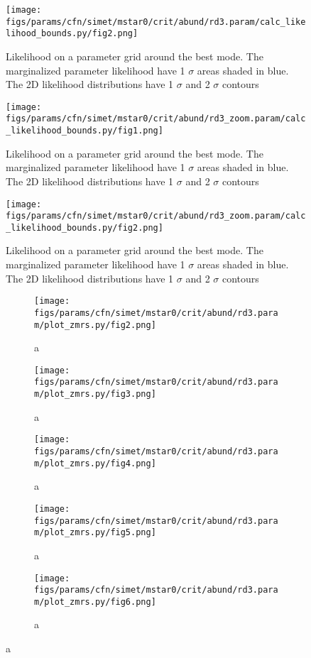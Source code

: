 \documentclass[twocolumn]{article}
\begin{document}
\begin{figure}[H]
  \center\texttt{[image: figs/params/cfn/simet/mstar0/crit/abund/rd3.param/calc\_likelihood\_bounds.py/fig2.png]}
  \caption{Likelihood on a parameter grid around the best mode. The marginalized parameter likelihood have
    1 $\sigma$ areas shaded in blue. The 2D likelihood distributions have 1 $\sigma$  and 2 $\sigma$ contours}
  \label{fig:basic_rd:likelihood}
\end{figure}

\begin{figure}[H]
  \center\texttt{[image: figs/params/cfn/simet/mstar0/crit/abund/rd3\_zoom.param/calc\_likelihood\_bounds.py/fig1.png]}
  \caption{Likelihood on a parameter grid around the best mode. The marginalized parameter likelihood have
    1 $\sigma$ areas shaded in blue. The 2D likelihood distributions have 1 $\sigma$  and 2 $\sigma$ contours}
  \label{fig:basic_rd:likelihood}
\end{figure}

\begin{figure}[H]
  \center\texttt{[image: figs/params/cfn/simet/mstar0/crit/abund/rd3\_zoom.param/calc\_likelihood\_bounds.py/fig2.png]}
  \caption{Likelihood on a parameter grid around the best mode. The marginalized parameter likelihood have
    1 $\sigma$ areas shaded in blue. The 2D likelihood distributions have 1 $\sigma$  and 2 $\sigma$ contours}
  \label{fig:basic_rd:likelihood}
\end{figure}

\begin{figure}
  \begin{subfigure}{.5\textwidth}
    \centering\texttt{[image: figs/params/cfn/simet/mstar0/crit/abund/rd3.param/plot\_zmrs.py/fig2.png]}
    \caption{a}
  \end{subfigure}
  \begin{subfigure}{.5\textwidth}
    \centering\texttt{[image: figs/params/cfn/simet/mstar0/crit/abund/rd3.param/plot\_zmrs.py/fig3.png]}
    \caption{a}
  \end{subfigure}
  \begin{subfigure}{.5\textwidth}
    \centering\texttt{[image: figs/params/cfn/simet/mstar0/crit/abund/rd3.param/plot\_zmrs.py/fig4.png]}
    \caption{a}
  \end{subfigure}%
  \begin{subfigure}{.5\textwidth}
    \centering\texttt{[image: figs/params/cfn/simet/mstar0/crit/abund/rd3.param/plot\_zmrs.py/fig5.png]}
    \caption{a}
  \end{subfigure}
  \begin{subfigure}{.5\textwidth}
    \centering\texttt{[image: figs/params/cfn/simet/mstar0/crit/abund/rd3.param/plot\_zmrs.py/fig6.png]}
    \caption{a}
  \end{subfigure}
\end{figure}
\clearpage
\end{document}
